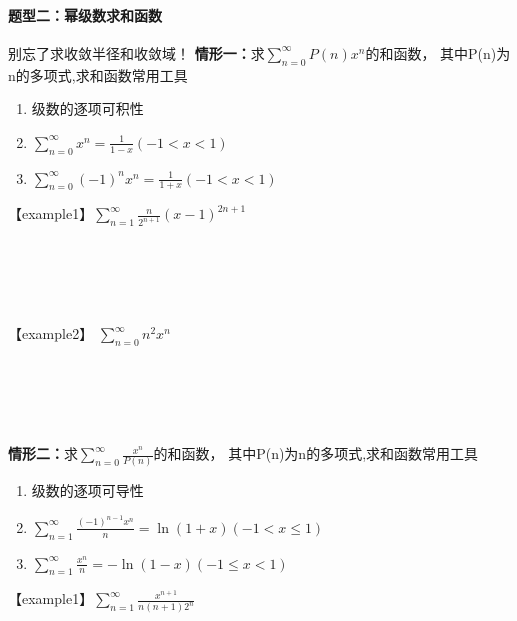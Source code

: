 \documentclass[12pt]{scrartcl}
\begin{document}
{\paragraph*{题型二：幂级数求和函数} \leavevmode \newline
别忘了求收敛半径和收敛域！\leavevmode \newline
\textbf{情形一：}求$\sum_{n = 0}^{\infty} P(n)x^n $的和函数，
其中P(n)为n的多项式,求和函数常用工具
\begin{enumerate}[label={\alph*}] 
    \item 级数的逐项可积性
    \item $\sum_{n = 0}^{\infty}x^n=\frac{1}{1-x}(-1<x<1)  $
    \item $\sum_{n = 0}^{\infty}(-1)^nx^n=\frac{1}{1+x}(-1<x<1)  $
\end{enumerate}
【example1】$\sum_{n = 1}^{\infty}\frac{n}{2^{n+1}} (x-1)^{2n+1}$\newline
\\
\\
\\
\\
\\
\\
【example2】 $\sum_{n = 0}^{\infty}n^2x^n$\leavevmode \newline
\\
\\
\\
\\
\\
\\

\noindent\textbf{情形二：}求$\sum_{n = 0}^{\infty} \frac{x^n}{ P(n)} $的和函数，
其中P(n)为n的多项式,求和函数常用工具
\begin{enumerate}[label={\alph*}] 
    \item 级数的逐项可导性
    \item $\sum_{n = 1}^{\infty}\frac{(-1)^{n-1}x^n}{n} =\ln (1+x) (-1<x\leqslant 1)  $
    \item $\sum_{n = 1}^{\infty}\frac{x^n}{n} =-\ln (1-x) (-1\leqslant x<1)  $
\end{enumerate}
【example1】$\sum_{n = 1}^{\infty}\frac{x^{n+1}}{n(n+1)2^n} $\leavevmode \newline
\\
\\
\\
\\
\\
\\

}
\end{document}
